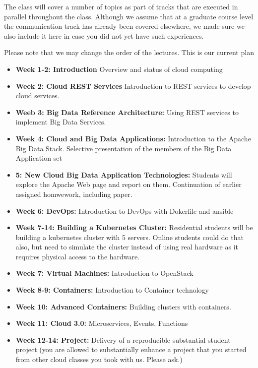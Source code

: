 The class will cover a number of topics as part of tracks that are
executed in parallel throughout the class. Although we assume that at
a graduate course level the communication track has already been
covered elsewhere, we made sure we also include it here in case you did
not yet have such experiences.

Please note that we may change the order of the lectures. This is our
current plan

\begin{itemize}

\item {\bf Week 1-2: Introduction} Overview and status of cloud
  computing
\item {\bf Week 2: Cloud REST Services} Introduction to REST services
  to develop cloud services.
\item {\bf Weeb 3: Big Data Reference Architecture:} Using REST
  services to implement Big Data Services.
\item {\bf Week 4: Cloud and Big Data Applications:} Introduction to
  the Apache Big Data Stack. Selective presentation of the members of
  the Big Data Application set
\item {\bf 5: New Cloud Big Data Application Technologies:} Students will
  explore the Apache Web page and report on them. Continuation of
  earlier assigned homwework, including paper.
\item {\bf Week 6: DevOps:} Introduction to DevOps with Dokerfile and
  ansible
\item {\bf Week 7-14: Building a Kubernetes Cluster:} Residential
  students will be building a kubernetes cluster with 5
  servers. Online students could do that also, but need to simulate
  the cluster instead of using real hardware as it requires physical
  access to the hardware.

\item {\bf Week 7: Virtual Machines:} Introduction to OpenStack
\item {\bf Week 8-9: Containers:} Introduction to Container technology
\item {\bf Week 10: Advanced Containers:} Building clusters with containers.
\item {\bf Week 11: Cloud 3.0:} Microservices, Events, Functions  
\item {\bf Week 12-14: Project:} Delivery of a reproducible substantial
  student project (you are allowed to substantially enhance a project
  that you started from other cloud classes you took with us. Please ask.)
\end{itemize}

